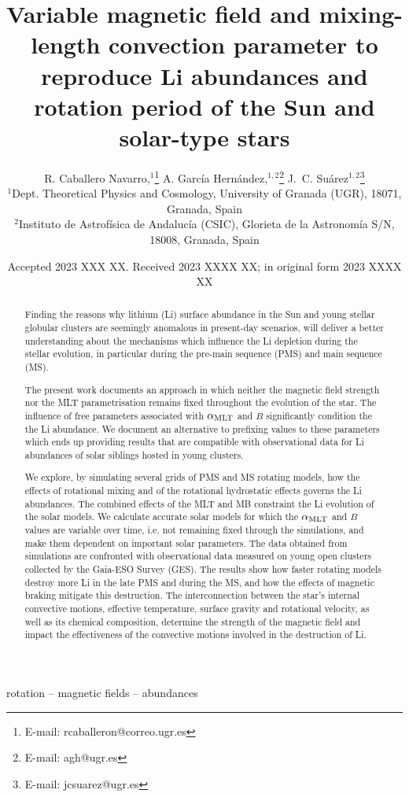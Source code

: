 \documentclass[fleqn,usenatbib]{mnras}
\title[Rotation, magnetic braking \& Li abundances II]{Variable magnetic field and mixing-length convection parameter to reproduce Li abundances and rotation period of the Sun and solar-type stars}
\author[R. Caballero Navarro et al.]{
R. Caballero Navarro,$^{1}$\thanks{E-mail: rcaballeron@correo.ugr.es}
A. Garc\'ia Hern\'andez,$^{1,2}$\thanks{E-mail: agh@ugr.es}
J.~C. Su\'arez$^{1,2}$\thanks{E-mail: jcsuarez@ugr.es}
\\
$^{1}$Dept. Theoretical Physics and Cosmology, University of Granada (UGR), 18071, Granada, Spain\\
$^{2}$Instituto de Astrof\'isica de Andaluc\'ia (CSIC), Glorieta de la Astronom\'ia S/N, 18008, Granada, Spain\\
}
\date{Accepted 2023 XXX XX. Received 2023 XXXX XX; in original form 2023 XXXX XX}
\begin{document}
\label{firstpage}
\pagerange{\pageref{firstpage}--\pageref{lastpage}}
\maketitle

\begin{abstract}
Finding the reasons why lithium (Li) surface abundance in the Sun and young stellar globular clusters are seemingly anomalous in present-day scenarios, will deliver a better understanding about the mechanisms which influence the Li depletion during the stellar evolution, in particular during the pre-main sequence (PMS) and main sequence (MS).\par

The present work documents an approach in which neither the magnetic field strength nor the MLT parametrisation remains fixed throughout the evolution of the star. The influence of free parameters associated with $\alpha_{\mathrm{MLT}}$ and $B$ significantly condition the the Li abundance. We document an alternative to prefixing values to these parameters which ends up providing results that are compatible with observational data for Li abundances of solar siblings hosted in young clusters.\par

We explore, by simulating several grids of PMS and MS rotating models, how the effects of rotational mixing and of the rotational hydrostatic effects governs the Li abundances. The combined effects of the MLT and MB constraint the Li evolution of the solar models. We calculate accurate solar models for which the $\alpha_{\mathrm{MLT}}$ and $B$ values are variable over time, i.e. not remaining fixed through the simulations, and make them dependent on important solar parameters. The data obtained from simulations are confronted with observational data measured on young open clusters collected by the Gaia-ESO Survey (GES). The results show how faster rotating models destroy more Li in the late PMS and during the MS, and how the effects of magnetic braking mitigate this destruction. The interconnection between the star's internal convective motions, effective temperature, surface gravity and rotational velocity, as well as its chemical composition, determine the strength of the magnetic field and impact the effectiveness of the convective motions involved in the destruction of Li. 

\end{abstract}

\begin{keywords}
rotation -- magnetic fields -- abundances
\end{keywords}
\end{document}
